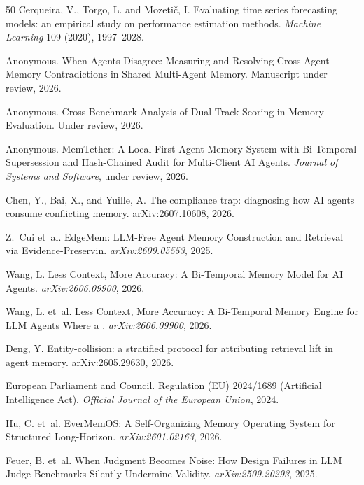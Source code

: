 \documentclass[sigconf,nonacm]{acmart}
\begin{document}
\begin{thebibliography}{50}
Cerqueira, V., Torgo, L. and Mozetič, I. Evaluating time series forecasting models: an empirical study on performance estimation methods. \emph{Machine Learning} 109 (2020), 1997--2028.

Anonymous.
\newblock When Agents Disagree: Measuring and Resolving Cross-Agent Memory Contradictions in Shared Multi-Agent Memory.
\newblock Manuscript under review, 2026.

Anonymous. Cross-Benchmark Analysis of Dual-Track Scoring in Memory Evaluation. Under review, 2026.

Anonymous.
\newblock MemTether: A Local-First Agent Memory System with Bi-Temporal Supersession and Hash-Chained Audit for Multi-Client AI Agents.
\newblock \emph{Journal of Systems and Software}, under review, 2026.

Chen, Y., Bai, X., and Yuille, A. The compliance trap: diagnosing how AI agents
consume conflicting memory. arXiv:2607.10608, 2026.

Z.~Cui et~al.
\newblock EdgeMem: LLM-Free Agent Memory Construction and Retrieval via Evidence-Preservin. \newblock \emph{arXiv:2609.05553}, 2025.

Wang, L.
\newblock Less Context, More Accuracy: A Bi-Temporal Memory Model for AI Agents.
\newblock \emph{arXiv:2606.09900}, 2026.

Wang, L. et~al.
\newblock Less Context, More Accuracy: A Bi-Temporal Memory Engine for LLM Agents Where a . \newblock \emph{arXiv:2606.09900}, 2026.

Deng, Y. Entity-collision: a stratified protocol for attributing retrieval lift
in agent memory. arXiv:2605.29630, 2026.

European Parliament and Council.
\newblock Regulation (EU) 2024/1689 (Artificial Intelligence Act).
\newblock \emph{Official Journal of the European Union}, 2024.

Hu, C. et~al.
\newblock EverMemOS: A Self-Organizing Memory Operating System for Structured Long-Horizon. \newblock \emph{arXiv:2601.02163}, 2026.

Feuer, B. et~al.
\newblock When Judgment Becomes Noise: How Design Failures in LLM Judge Benchmarks Silently Undermine Validity.
\newblock \emph{arXiv:2509.20293}, 2025.


\end{thebibliography}
\end{document}
